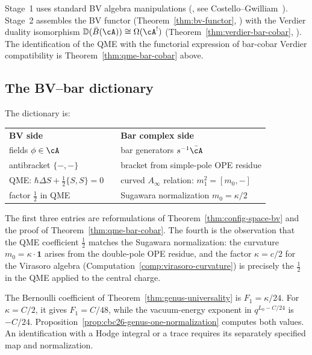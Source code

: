 \begin{remark}[Scope]
Stage~1 uses standard BV algebra manipulations (\ClaimStatusProvedElsewhere,
see Costello--Gwilliam~\cite{CG17}).  Stage~2 assembles the BV
functor (Theorem~\ref{thm:bv-functor}, \ClaimStatusProvedHere) with
the Verdier duality isomorphism $\mathbb{D}(\bar{B}(\cA)) \cong \Omega(\cA^!)$
(Theorem~\ref{thm:verdier-bar-cobar}, \ClaimStatusProvedHere).  The
identification of the QME with the functorial expression of bar-cobar
Verdier compatibility is Theorem~\ref{thm:qme-bar-cobar} above.
\end{remark}

\subsection{The BV--bar dictionary}
\label{subsec:bv-bar-identification}

The dictionary is:
\begin{center}
\begin{tabular}{lcl}
\textbf{BV side} && \textbf{Bar complex side} \\[2pt]
fields $\phi \in \cA$ && bar generators $s^{-1}\bar{\cA}$ \\
antibracket $\{-,-\}$ && bracket from simple-pole OPE residue \\
QME: $\hbar\Delta S + \tfrac{1}{2}\{S,S\} = 0$
  && curved $A_\infty$ relation: $m_1^2 = [m_0, -]$ \\
factor $\tfrac{1}{2}$ in QME && Sugawara normalization $m_0 = \kappa/2$
\end{tabular}
\end{center}
The first three entries are reformulations of
Theorem~\ref{thm:config-space-bv} and the proof of
Theorem~\ref{thm:qme-bar-cobar}.  The fourth is the observation
that the QME coefficient $\tfrac{1}{2}$ matches the Sugawara
normalization: the curvature $m_0 = \kappa \cdot \mathbf{1}$ arises
from the double-pole OPE residue, and the factor $\kappa = c/2$ for
the Virasoro algebra (Computation~\ref{comp:virasoro-curvature})
is precisely the $\tfrac{1}{2}$ in the QME applied to the central
charge.



\begin{remark}\label{rem:genus1-bv}
The Bernoulli coefficient of Theorem~\ref{thm:genus-universality} is $F_1=\kappa/24$.
For $\kappa=C/2$, it gives $F_1=C/48$, while the vacuum-energy exponent in $q^{L_0-C/24}$ is $-C/24$.
Proposition~\ref{prop:cbc26-genus-one-normalization} computes both values.
An identification with a Hodge integral or a trace requires its separately specified map and normalization.
\end{remark}


